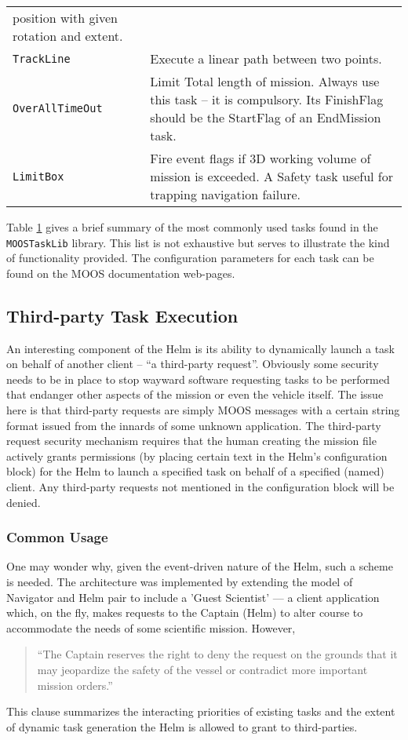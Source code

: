 \documentclass[a4paper,10pt]{article}
\newcommand{\Code}[1]{\texttt{#1} }
\newcommand{\code}[1]{\Code{#1} }
\begin{document}
\begin{table}[ht]
\begin{tabular}{p{}|p{}}
position with given rotation and extent.\\%
%
\code{TrackLine} & Execute a linear path between two points.
\\%
%
\code{OverAllTimeOut} & Limit Total length of mission. Always use
this task -- it is compulsory. Its FinishFlag should be the
StartFlag of an EndMission task.
\\%
%
\code{LimitBox} & Fire event flags if 3D working volume of mission
is exceeded. A Safety task useful for trapping navigation failure.
\\%
\end{tabular}
\label{tab:TaskSummaries}
\end{table}


Table \ref{tab:TaskSummaries} gives a brief summary of the most
commonly used tasks found in the \code{MOOSTaskLib} library. This
list is not exhaustive but serves to illustrate the kind of
functionality provided. The configuration parameters for each task
can be found on the MOOS documentation web-pages.


\subsection{Third-party Task Execution}
An interesting component of the Helm is its ability to dynamically
launch a task on behalf of another client -- ``a third-party
request''. Obviously some security needs to be in place to stop
wayward software requesting tasks to be performed that endanger
other aspects of the mission or even the vehicle itself. The issue
here is that third-party requests are simply MOOS messages with a
certain string format issued from the innards of some unknown
application. The third-party request security mechanism requires
that the human creating the mission file actively grants
permissions (by placing certain text in the Helm's configuration
block) for the Helm to launch a specified task on behalf of a
specified (named) client. Any third-party requests not mentioned
in the configuration block will be denied.

\subsubsection{Common Usage}
One may wonder why, given the event-driven nature of the Helm, such
a scheme is needed. The architecture was implemented by extending
the model of Navigator and Helm pair to include a 'Guest
Scientist' --- a client application which, on the fly, makes
requests to the Captain (Helm) to alter course to accommodate the
needs of some scientific mission. However,\begin{quote}``The
Captain reserves the right to deny the request on the grounds that
it may jeopardize the safety of the vessel or contradict more
important mission orders.''\end{quote} This clause summarizes the
interacting priorities of existing tasks and the extent of dynamic
task generation the Helm is allowed to grant to third-parties.
\end{document}
